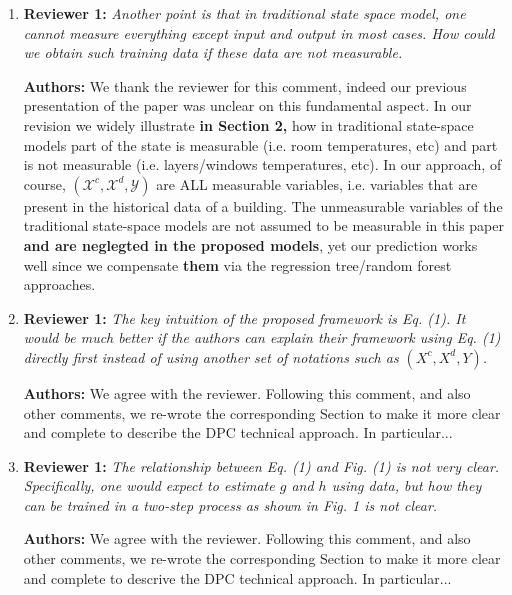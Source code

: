 \documentclass{article}
\begin{document}
\begin{enumerate}
\begin{itemize}
	\end{itemize}



\item \textbf{Reviewer 1:} \textit{Another point is that in traditional state space model, one cannot measure everything except input and output in most cases. How could we obtain such training data if these data are not measurable.}



\textbf{Authors:} We thank the reviewer for this comment, indeed our previous presentation of the paper was unclear on this fundamental aspect. In our revision we widely illustrate \textbf{in Section 2,} how in traditional state-space models part of the state is measurable (i.e. room temperatures, etc) and part is not measurable (i.e. layers/windows temperatures, etc). In our approach, of course, $(\mathcal{X}^c, \mathcal{X}^d, \mathcal{Y})$ are ALL measurable variables, i.e. variables that are present in the historical data of a building. The unmeasurable variables of the traditional state-space models are not assumed to be measurable in this paper \textbf{and are neglegted in the proposed models}, yet our prediction works well since we compensate \textbf{them} via the regression tree/random forest approaches.



\item \textbf{Reviewer 1:} \textit{The key intuition of the proposed framework is Eq. (1). It would be much better if the authors can explain their framework using Eq. (1) directly first instead of using another set of notations such as $(X^c, X^d, Y)$.}



\textbf{Authors:} We agree with the reviewer. Following this comment, and also other comments, we re-wrote the corresponding Section to make it more clear and complete to describe the DPC technical approach. In particular...



\item \textbf{Reviewer 1:} \textit{The relationship between Eq. (1) and Fig. (1) is not very clear. Specifically, one would expect to estimate $g$ and $h$ using data, but how they can be trained in a two-step process as shown in Fig. 1 is not clear.}



\textbf{Authors:} We agree with the reviewer. Following this comment, and also other comments, we re-wrote the corresponding Section to make it more clear and complete to descrive the DPC technical approach. In particular...



\end{enumerate}
\end{document}
